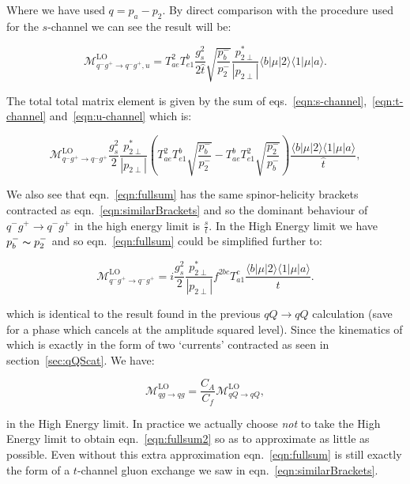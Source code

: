 			Where we have used $q=p_a-p_2$.  By direct comparison with the procedure used for the $s$-channel we can see the result will be:

			\begin{equation}
			\mathcal{M}_{q^-g^+\to q^-g^+, u}^{\text{LO}}=
			T^2_{ae}T^b_{e1}\frac{g_s^2}{2\hat{t}}\sqrt{\frac{p_b^-}{p_2^-}}\frac{p^*_{2\perp}}{|p_{2\perp}|}\langle{b}|\mu|2\rangle\langle{1}|\mu|a\rangle.
			\label{eqn:u-channel}
			\end{equation}

			The total total matrix element is given by the sum of eqs.~\eqref{eqn:s-channel},~\eqref{eqn:t-channel} and~\eqref{eqn:u-channel} which is:

			\begin{equation}
				\mathcal{M}_{q^-g^+\to q^-g^+}^{\text{LO}}
				\frac{g_s^2}{2}\frac{p_{2\perp}^*}{|p_{2\perp}|}\left(T^2_{ae}T^b_{e1}\sqrt{\frac{p_b^-}{p_2^-}}-T^b_{ae}T^2_{e1}
				\sqrt{\frac{p_2^-}{p_b^-}}\right)\frac{\langle{b}|\mu|2\rangle\langle{1}|\mu|a\rangle}{\hat{t}},
				\label{eqn:fullsum}
			\end{equation}

			We also see that eqn.~\eqref{eqn:fullsum} has the same spinor-helicity brackets contracted as eqn.~\eqref{eqn:similarBrackets}
			and so the dominant behaviour of $q^-g^+\to q^-g^+$ in the high energy limit is $\frac{s}{t}$.
			In the High Energy limit we have $p_b^-\thicksim p_2^-$ and so eqn.~\eqref{eqn:fullsum} could be simplified
			further to:

			\begin{equation}
				\mathcal{M}_{q^-g^+\to q^-g^+}^{\text{LO}}=i\frac{g_s^2}{2}\frac{p_{2\perp}^*}{|p_{2\perp}|}f^{2bc}T^c_{a1}
				\frac{\langle{b}|\mu|2\rangle\langle{1}|\mu|a\rangle}{\hat{t}}.
				\label{eqn:fullsum2}
			\end{equation}

			which is identical to the result found in the previous $qQ\rightarrow qQ$ calculation (save for a phase which cancels
			at the amplitude squared level). Since the kinematics of which is exactly in the form of two `currents' contracted as
			seen in section~\ref{sec:qQScat}.  We have:

			\begin{equation}
				\mathcal{M}_{qg\to qg}^{\text{LO}} = \frac{C_A}{C_f} \mathcal{M}_{qQ\to qQ}^{\text{LO}},
			\end{equation}

			in the High Energy limit. In practice we actually choose \emph{not} to take the High Energy limit to obtain
			eqn.~\eqref{eqn:fullsum2} so as to approximate as little as possible.  Even without this extra approximation
			eqn.~\eqref{eqn:fullsum} is still exactly the form of a $t$-channel gluon exchange we saw in
			eqn.~\eqref{eqn:similarBrackets}.

